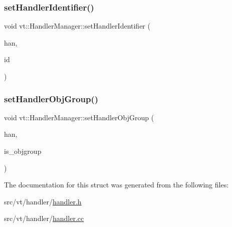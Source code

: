 \subsubsection{\texorpdfstring{set\+Handler\+Identifier()}{setHandlerIdentifier()}}
{\footnotesize\ttfamily void vt\+::\+Handler\+Manager\+::set\+Handler\+Identifier (\begin{DoxyParamCaption}\item[{\hyperlink{namespacevt_af64846b57dfcaf104da3ef6967917573}{Handler\+Type} \&}]{han,  }\item[{\hyperlink{namespacevt_a59ae068fe828d1c33051ff96f3d016b6}{Handler\+Identifier\+Type}}]{id }\end{DoxyParamCaption})\hspace{0.3cm}{\ttfamily [static]}}

\mbox{\label{structvt_1_1_handler_manager_a0822ddaf90168e28fc9974e7f672b529}} 
\subsubsection{\texorpdfstring{set\+Handler\+Obj\+Group()}{setHandlerObjGroup()}}
{\footnotesize\ttfamily void vt\+::\+Handler\+Manager\+::set\+Handler\+Obj\+Group (\begin{DoxyParamCaption}\item[{\hyperlink{namespacevt_af64846b57dfcaf104da3ef6967917573}{Handler\+Type} \&}]{han,  }\item[{bool}]{is\+\_\+objgroup }\end{DoxyParamCaption})\hspace{0.3cm}{\ttfamily [static]}}



The documentation for this struct was generated from the following files\+:\begin{DoxyCompactItemize}
\item 
src/vt/handler/\hyperlink{handler_8h}{handler.\+h}\item 
src/vt/handler/\hyperlink{handler_8cc}{handler.\+cc}\end{DoxyCompactItemize}
